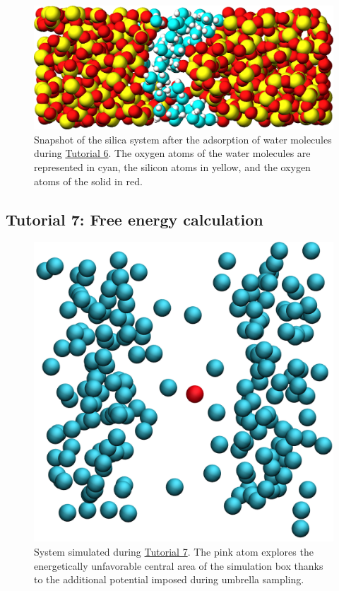 \documentclass[9pt,tutorial]{livecoms}
\begin{document}
\begin{figure}
\centering
\includegraphics[width=\linewidth]{GCMC-solvated}
\caption{Snapshot of the silica system after the adsorption of water molecules
during \hyperref[gcmc-silica-label]{Tutorial 6}.
The oxygen atoms of the water molecules are represented in cyan, the silicon
atoms in yellow, and the oxygen atoms of the solid in red.}
\label{fig:GCMC-solvated}
\end{figure}

\subsection{Tutorial 7: Free energy calculation}
\label{umbrella-sampling-label}

\begin{figure}
\centering
\includegraphics[width=0.7\linewidth]{US}
\caption{System simulated during \hyperref[umbrella-sampling-label]{Tutorial 7}.
The pink atom explores the energetically unfavorable central area of the simulation
box thanks to the additional potential imposed during umbrella sampling.}
\label{fig:US}
\end{figure}
\end{document}
